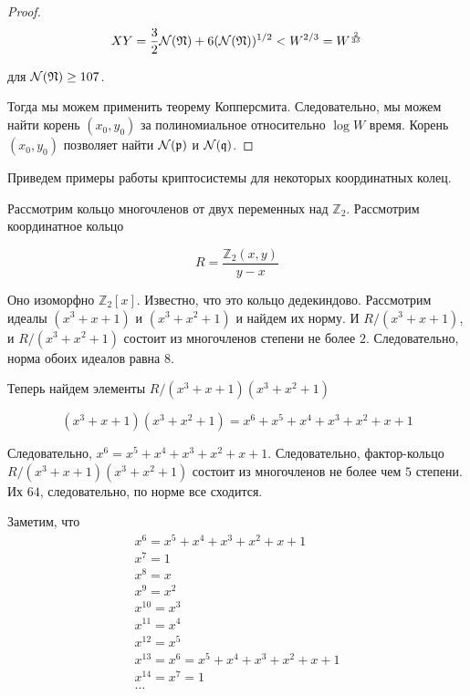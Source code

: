 \documentclass[_00_dissertation.tex]{subfiles}
\begin{document}
\begin{proof}
    \begin{equation*}
        XY = \frac{3}{2}\mathcal{N}(\mathfrak{N}) + 6(\mathcal{N}(\mathfrak{N}))^{1/2} < W^{2/3} = W^{\frac{2}{3\delta}}
    \end{equation*}
    
    для $\mathcal{N}(\mathfrak{N}) \ge 107$.
  
    Тогда мы можем применить теорему Копперсмита.
    Следовательно, мы можем найти корень $(x_0,y_0)$ за полиномиальное относительно $\log W$ время.
    Корень $(x_0,y_0)$ позволяет найти $\mathcal{N}(\mathfrak{p})$ и $\mathcal{N}(\mathfrak{q})$.
\end{proof}

Приведем примеры работы криптосистемы для некоторых координатных колец.

\begin{example}
	Рассмотрим кольцо многочленов от двух переменных над $\mathbb{Z}_2$.
	Рассмотрим координатное кольцо
	
	\begin{equation*}
		R = \frac{\mathbb{Z}_2(x, y)}{y-x}
	\end{equation*}
	
	Оно изоморфно $\mathbb{Z}_2[x]$.
	Известно, что это кольцо дедекиндово.
	Рассмотрим идеалы $(x^3 + x + 1)$ и $(x^3 + x^2 + 1)$ и найдем их норму.
	И $R/(x^3 + x + 1)$, и $R/(x^3 + x^2 + 1)$ состоит из многочленов степени не более $2$.
	Следовательно, норма обоих идеалов равна $8$.
	
	Теперь найдем элементы $R/(x^3 + x + 1)(x^3 + x^2 + 1)$
	
	\begin{equation*}
		(x^3 + x + 1)(x^3 + x^2 + 1) = x^6 + x^5 + x^4 + x^3 + x^2 + x + 1
	\end{equation*}
	
	Следовательно, $x^6 = x^5 + x^4 + x^3 + x^2 + x + 1$.
	Следовательно, фактор-кольцо $R/(x^3 + x + 1)(x^3 + x^2 + 1)$ состоит из многочленов не более чем $5$ степени.
	Их $64$, следовательно, по норме все сходится.
	
	Заметим, что
	\begin{equation*}
		\begin{array}{l}
			x^6 = x^5 + x^4 + x^3 + x^2 + x + 1\\
			x^7 = 1\\
			x^8 = x\\
			x^9 = x^2\\
			x^{10} = x^3\\
			x^{11} = x^4\\
			x^{12} = x^5\\
			x^{13} = x^6 = x^5 + x^4 + x^3 + x^2 + x + 1\\
			x^{14} = x^7 = 1\\
			\ldots
		\end{array}
	\end{equation*}
	

\end{example}
\end{document}
